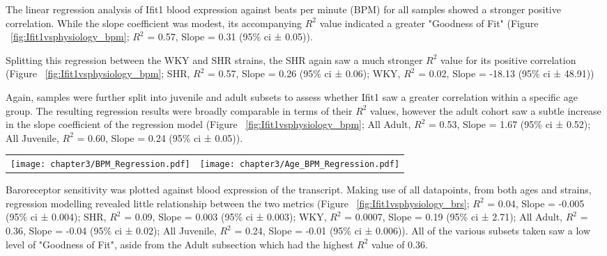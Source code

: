 The linear regression analysis of Ifit1 blood expression against beats per minute (BPM) for all samples showed a stronger positive correlation. While the slope coefficient was modest, its accompanying $R^{2}$ value indicated a greater "Goodness of Fit" (Figure ~\ref{fig:Ifit1vsphysiology_bpm}; $R^{2}$ = 0.57, Slope = 0.31 (95\% \acrshort{ci} ± 0.05)).

Splitting this regression between the WKY and SHR strains, the SHR again saw a much stronger $R^{2}$ value for its positive correlation (Figure ~\ref{fig:Ifit1vsphysiology_bpm}; SHR, $R^{2}$ = 0.57, Slope = 0.26 (95\% \acrshort{ci} ± 0.06); WKY, $R^{2}$ = 0.02, Slope = -18.13 (95\% \acrshort{ci} ± 48.91))

Again, samples were further split into juvenile and adult subsets to assess whether Ifit1 saw a greater correlation within a specific age group. The resulting regression results were broadly comparable in terms of their $R^{2}$ values, however the adult cohort saw a subtle increase in the slope coefficient of the regression model (Figure ~\ref{fig:Ifit1vsphysiology_bpm}; All Adult, $R^{2}$ = 0.53, Slope = 1.67 (95\% \acrshort{ci} ± 0.52); All Juvenile, $R^{2}$ = 0.60, Slope = 0.24 (95\% \acrshort{ci} ± 0.05)).

\begin{figure*}[!htbp]
\centering
\begin{tabular}{cc}
\texttt{[image: chapter3/BPM\_Regression.pdf]} & \texttt{[image: chapter3/Age\_BPM\_Regression.pdf]} \\
\end{tabular}
\caption[Linear Regression Analysis of Physiological \acrshort{bpm} against Ifit1 blood expression]{Linear Regression Analysis of Physiological \acrfull{bpm} against Oaz1 normalised Ifit1 blood expression $2^{-\Delta\Delta C_{T}}$ values. For the regression model, displayed here are the slope coefficient of the regression line and the $R^{2}$ correlation coefficient. Also highlighted in grey is the 95\% \acrfull{ci} range for the model. Note the rescaled x-axis for the \acrshort{wky} plot.}
\label{fig:Ifit1vsphysiology_bpm}
\end{figure*}

Baroreceptor sensitivity was plotted against blood expression of the transcript. Making use of all datapoints, from both ages and strains, regression modelling revealed little relationship between the two metrics (Figure ~\ref{fig:Ifit1vsphysiology_brs}; $R^{2}$ = 0.04, Slope = -0.005 (95\% \acrshort{ci} ± 0.004); SHR, $R^{2}$ = 0.09, Slope = 0.003 (95\% \acrshort{ci} ± 0.003); WKY, $R^{2}$ = 0.0007, Slope = 0.19 (95\% \acrshort{ci} ± 2.71); All Adult, $R^{2}$ = 0.36, Slope = -0.04 (95\% \acrshort{ci} ± 0.02); All Juvenile, $R^{2}$ = 0.24, Slope = -0.01 (95\% \acrshort{ci} ± 0.006)). All of the various subsets taken saw a low level of "Goodness of Fit", aside from the Adult subsection which had the highest $R^{2}$ value of 0.36. \\

